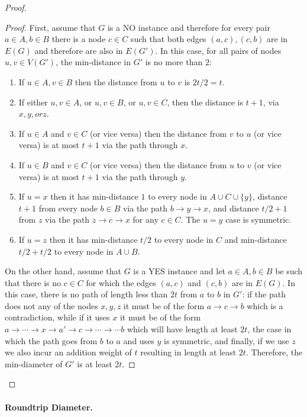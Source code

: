 \begin{proof}
\begin{proof}
First, assume that $G$ is a NO instance and therefore for every pair $a\in A,b \in B$ there is a node $c \in C$ such that both edges $(a,c),(c,b)$ are in $E(G)$ and therefore are also in $E(G')$.
In this case, for all pairs of nodes $u,v \in V(G')$, the min-distance in $G'$ is no more than $2$:
\begin{enumerate} 
\item If $u \in A, v \in B$ then the distance from $u$ to $v$ is $2 t/2 = t$.
\item If either $u,v \in A$, or $u,v\in B$, or $u,v\in C$, then the distance is $t+1$, via $x,y, or z$.
\item If $u \in A$ and $v \in C$ (or vice versa) then the distance from $v$ to $u$ (or vice versa) is at most $t+1$ via the path through $x$.
\item If $u \in B$ and $v \in C$ (or vice versa) then the distance from $u$ to $v$ (or vice versa) is at most $t+1$ via the path through $y$.
\item If $u=x$ then it has min-distance $1$ to every node in $A \cup C \cup \{y\}$, distance $t+1$ from every node $b\in B$ via the path $b \to y \to x$, and distance $t/2+1$ from $z$ via the path $z \to c \to x$ for any $c \in C$. The $u=y$ case is symmetric.
\item If $u=z$ then it has min-distance $t/2$ to every node in $C$ and min-distance $t/2+t/2$ to every node in $A \cup B$.
\end{enumerate}
On the other hand, assume that $G$ is a YES instance and let $a\in A, b \in B$ be such that there is no $c \in C$ for which the edges $(a,c)$ and $(c,b)$ are in $E(G)$. 
In this case, there is no path of length less than $2t$ from $a$ to $b$ in $G'$: if the path does not any of the nodes $x,y,z$ it must be of the form $a \to c \to b$ which is a contradiction, while if it uses $x$ it must be of the form $a \to \cdots \to x \to a' \to c \to \cdots \to \cdots b$ which will have length at least $2t$, the case in which the path goes from $b$ to $a$ and uses $y$ is symmetric, and finally, if we use $z$ we also incur an addition weight of $t$ resulting in length at least $2t$.
Therefore, the min-diameter of $G'$ is at least $2t$.
\end{proof}

\end{proof}

\paragraph{Roundtrip Diameter.}

